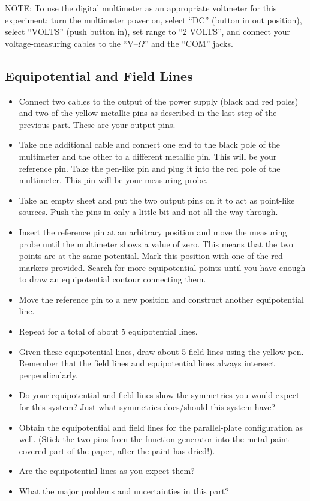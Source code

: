 NOTE: To use the digital multimeter as an appropriate voltmeter for this experiment: turn the multimeter power on, select ``DC'' (button in out position), select ``VOLTS'' (push button in), set range to ``2 VOLTS'', and connect your voltage-measuring cables to the ``$\mathrm{V}$--$\Omega$'' and the ``COM'' jacks.

\subsection{Equipotential and Field Lines}

\begin{itemize}
    \item Connect two cables to the output of the power supply (black and red poles) and two of the yellow-metallic pins as described in the last step of the previous part. These are your output pins.
    \item Take one additional cable and connect one end to the black pole of the multimeter and the other to a different metallic pin. This will be your reference pin. Take the pen-like pin and plug it into the red pole of the multimeter. This pin will be your measuring probe.
    \item Take an empty sheet and put the two output pins on it to act as point-like sources. Push the pins in only a little bit and not all the way through.
    \item Insert the reference pin at an arbitrary position and move the measuring probe until the multimeter shows a value of zero. This means that the two points are at the same potential. Mark this position with one of the red markers provided. Search for more equipotential points until you have enough to draw an equipotential contour connecting them.
    \item Move the reference pin to a new position and construct another equipotential line.
    \item Repeat for a total of about 5 equipotential lines.
    \item Given these equipotential lines, draw about 5 field lines using the yellow pen. Remember that the field lines and equipotential lines always intersect perpendicularly.
    \item Do your equipotential and field lines show the symmetries you would expect for this system? Just what symmetries does/should this system have?
    \item Obtain the equipotential and field lines for the parallel-plate configuration as well. (Stick the two pins from the function generator into the metal paint-covered part of the paper, after the paint has dried!).
    \item Are the equipotential lines as you expect them?
    \item What the major problems and uncertainties in this part?
\end{itemize}

